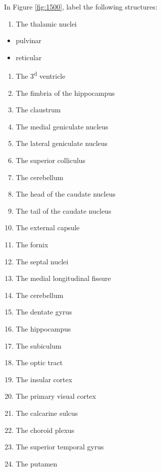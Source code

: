 \documentclass[]{book}
\providecommand{\tightlist}{%
  \setlength{\itemsep}{0pt}\setlength{\parskip}{0pt}}
\begin{document}
In Figure \ref{fig:1500}, label the following structures:

\begin{enumerate}
\def\labelenumi{\arabic{enumi}.}
\tightlist
\item
  The thalamic nuclei
\end{enumerate}

\begin{itemize}
\tightlist
\item
  pulvinar
\item
  reticular
\end{itemize}

\begin{enumerate}
\def\labelenumi{\arabic{enumi}.}
\tightlist
\item
  The 3\textsuperscript{d} ventricle
\item
  The fimbria of the hippocampus
\item
  The claustrum
\item
  The medial geniculate nucleus
\item
  The lateral geniculate nucleus
\item
  The superior colliculus
\item
  The cerebellum
\item
  The head of the caudate nucleus
\item
  The tail of the caudate nucleus
\item
  The external capsule
\item
  The fornix
\item
  The septal nuclei
\item
  The medial longitudinal fissure
\item
  The cerebellum
\item
  The dentate gyrus
\item
  The hippocampus
\item
  The subiculum
\item
  The optic tract
\item
  The insular cortex
\item
  The primary visual cortex
\item
  The calcarine sulcus
\item
  The choroid plexus
\item
  The superior temporal gyrus
\item
  The putamen
\end{enumerate}
\end{document}

